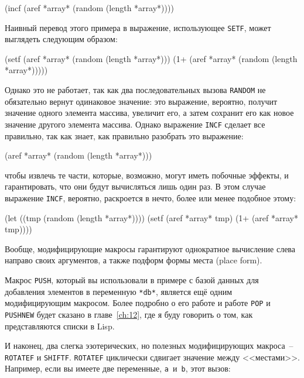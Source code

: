 \begin{myverb}
(incf (aref *array* (random (length *array*))))
\end{myverb}

Наивный перевод этого примера в выражение, использующее \lstinline{SETF}, может выглядеть
следующим образом:

\begin{myverb}
(setf (aref *array* (random (length *array*)))
      (1+ (aref *array* (random (length *array*)))))
\end{myverb}

Однако это не работает, так как два последовательных вызова \lstinline{RANDOM} не
обязательно вернут одинаковое значение: это выражение, вероятно, получит значение одного
элемента массива, увеличит его, а затем сохранит его как новое значение другого элемента
массива. Однако выражение \lstinline{INCF} сделает все правильно, так как знает, как
правильно разобрать это выражение:

\begin{myverb}
(aref *array* (random (length *array*)))
\end{myverb}

\noindent{}чтобы извлечь те части, которые, возможно, могут иметь побочные эффекты, и гарантировать,
что они будут вычисляться лишь один раз. В этом случае выражение \lstinline{INCF}, вероятно,
раскроется в нечто, более или менее подобное этому:

\begin{myverb}
(let ((tmp (random (length *array*))))
  (setf (aref *array* tmp) (1+ (aref *array* tmp))))
\end{myverb}

Вообще, модифицирующие макросы гарантируют однократное вычисление слева направо своих
аргументов, а также подформ формы места (place form).

Макрос \lstinline{PUSH}, который вы использовали в примере с базой данных для добавления
элементов в переменную \lstinline{*db*}, является ещё одним модифицирующим макросом. Более подробно о
его работе и работе \lstinline{POP} и \lstinline{PUSHNEW} будет сказано в главе~\ref{ch:12}, где
я буду говорить о том, как представляются списки в Lisp.

И наконец, два слегка эзотерических, но полезных модифицирующих макроса~--
\lstinline{ROTATEF} и \lstinline{SHIFTF}. \lstinline{ROTATEF} циклически сдвигает значение между
<<местами>>. Например, если вы имеете две переменные, \lstinline{a}~и~\lstinline{b}, этот вызов:

